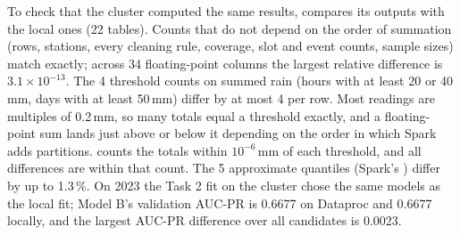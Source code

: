 To check that the cluster computed the same results,  compares its outputs with the local ones (22 tables). Counts that do not depend on the order of summation (rows, stations, every cleaning rule, coverage, slot and event counts, sample sizes) match exactly; across 34 floating-point columns the largest relative difference is $3.1\times10^{-13}$. The 4 threshold counts on summed rain (hours with at least 20 or 40\,mm, days with at least 50\,mm) differ by at most 4 per row. Most readings are multiples of 0.2\,mm, so many totals equal a threshold exactly, and a floating-point sum lands just above or below it depending on the order in which Spark adds partitions.  counts the totals within $10^{-6}$\,mm of each threshold, and all differences are within that count. The 5 approximate quantiles (Spark's ) differ by up to 1.3\,\%. On 2023 the Task 2 fit on the cluster chose the same models as the local fit; Model B's validation AUC-PR is 0.6677 on Dataproc and 0.6677 locally, and the largest AUC-PR difference over all candidates is 0.0023.

\begin{table}[H]\centering\small

\caption{Wall time per stage in seconds, on the local machine and on Dataproc, and their ratio; a ratio below one means Dataproc was faster. }\label{tab:cloudcmp}
\end{table}

